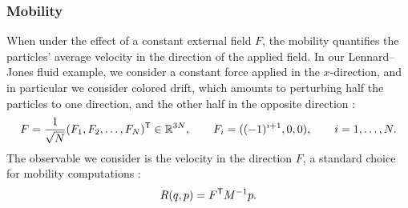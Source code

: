 \documentclass[11pt]{article}
\newcommand{\R}{\mathbb{R}}
\renewcommand{\t}{\mathsf T}
\theoremstyle{definition}
\begin{document}
\subsubsection{Mobility}
\label{subsubsec:mobility_num}
When under the effect of a constant external field $F$, the mobility quantifies the particles' average velocity in the direction of the applied field. In our Lennard--Jones fluid example, we consider a constant force applied in the $x$-direction, and in particular we consider colored drift, which amounts to perturbing half the particles to one direction, and the other half in the opposite direction \cite{evans2007}:
\begin{equation}
    \notag
	F = \frac{1}{\sqrt{N}}(F_1,F_2,\dotsc,F_N)^\t \in \R^{3N}, \qquad F_i = ((-1)^{i+1}, 0, 0), \qquad i = 1,\dotsc,N.
\end{equation}
The observable we consider is the velocity in the direction $F$, a standard choice for mobility computations \cite[Section 5.2.2]{lelievre2016}:
\begin{equation}
    \notag
	R(q,p) = F^\t M^{-1}p.
\end{equation}
\end{document}
